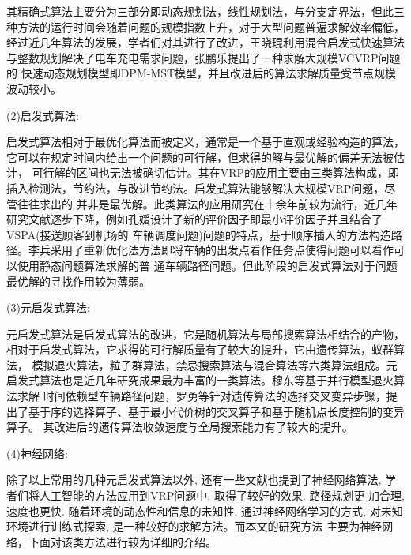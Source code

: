 其精确式算法主要分为三部分即动态规划法，线性规划法，与分支定界法，但此三种方法的运行时间会随着问题的规模指数上升，对于大型问题普遍求解效率偏低，
经过近几年算法的发展，学者们对其进行了改进，王晓琨利用混合启发式快速算法与整数规划解决了电车充电需求问题，张鹏乐提出了一种求解大规模VCVRP问题的
快速动态规划模型即DPM-MST模型，并且改进后的算法求解质量受节点规模波动较小。
\par
(2)启发式算法:

启发式算法相对于最优化算法而被定义，通常是一个基于直观或经验构造的算法，它可以在规定时间内给出一个问题的可行解，但求得的解与最优解的偏差无法被估计，
可行解的区间也无法被确切估计。其在VRP的应用主要由三类算法构成，即插入检测法，节约法，与改进节约法。启发式算法能够解决大规模VRP问题，尽管往往求出的
并非是最优解。此类算法的应用研究在十余年前较为流行，近几年研究文献逐步下降，例如孔媛设计了新的评价因子即最小评价因子并且结合了VSPA(接送顾客到机场的
车辆调度问题)问题的特点，基于顺序插入的方法构造路径。李兵采用了重新优化法方法即将车辆的出发点看作任务点使得问题可以看作可以使用静态问题算法求解的普
通车辆路径问题。但此阶段的启发式算法对于问题最优解的寻找作用较为薄弱。

\par
(3)元启发式算法:

元启发式算法是启发式算法的改进，它是随机算法与局部搜索算法相结合的产物，相对于启发式算法，它求得的可行解质量有了较大的提升，它由遗传算法，蚁群算法，
模拟退火算法，粒子群算法，禁忌搜索算法与混合算法等六类算法组成。元启发式算法也是近几年研究成果最为丰富的一类算法。穆东等基于并行模型退火算法求解
时间依赖型车辆路径问题，罗勇等针对遗传算法的选择交叉变异步骤，提出了基于序的选择算子、基于最小代价树的交叉算子和基于随机点长度控制的变异算子。
其改进后的遗传算法收敛速度与全局搜索能力有了较大的提升。
\par
(4)神经网络:

除了以上常用的几种元启发式算法以外, 还有一些文献也提到了神经网络算法, 学者们将人工智能的方法应用到VRP问题中, 取得了较好的效果. 路径规划更
加合理, 速度也更快. 随着环境的动态性和信息的未知性, 通过神经网络学习的方式, 对未知环境进行训练式探索, 是一种较好的求解方法。而本文的研究方法
主要为神经网络，下面对该类方法进行较为详细的介绍。

